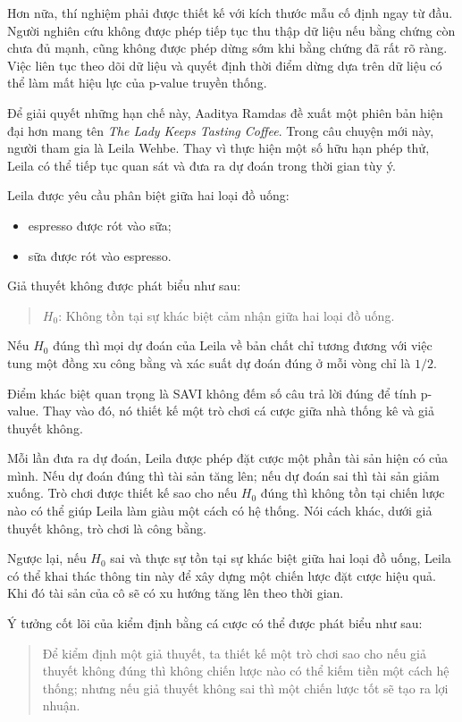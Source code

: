 Hơn nữa, thí nghiệm phải được thiết kế với kích thước mẫu cố định ngay từ đầu. Người nghiên cứu không được phép tiếp tục thu thập dữ liệu nếu bằng chứng còn chưa đủ mạnh, cũng không được phép dừng sớm khi bằng chứng đã rất rõ ràng. Việc liên tục theo dõi dữ liệu và quyết định thời điểm dừng dựa trên dữ liệu có thể làm mất hiệu lực của p-value truyền thống.

Để giải quyết những hạn chế này, Aaditya Ramdas đề xuất một phiên bản hiện đại hơn mang tên \textit{The Lady Keeps Tasting Coffee}. Trong câu chuyện mới này, người tham gia là Leila Wehbe. Thay vì thực hiện một số hữu hạn phép thử, Leila có thể tiếp tục quan sát và đưa ra dự đoán trong thời gian tùy ý.

Leila được yêu cầu phân biệt giữa hai loại đồ uống:
\begin{itemize}
    \item espresso được rót vào sữa;
    \item sữa được rót vào espresso.
\end{itemize}

Giả thuyết không được phát biểu như sau:
\begin{quote}
    $H_0$: Không tồn tại sự khác biệt cảm nhận giữa hai loại đồ uống.
\end{quote}

Nếu $H_0$ đúng thì mọi dự đoán của Leila về bản chất chỉ tương đương với việc tung một đồng xu công bằng và xác suất dự đoán đúng ở mỗi vòng chỉ là $1/2$.

Điểm khác biệt quan trọng là SAVI không đếm số câu trả lời đúng để tính p-value. Thay vào đó, nó thiết kế một trò chơi cá cược giữa nhà thống kê và giả thuyết không.

Mỗi lần đưa ra dự đoán, Leila được phép đặt cược một phần tài sản hiện có của mình. Nếu dự đoán đúng thì tài sản tăng lên; nếu dự đoán sai thì tài sản giảm xuống. Trò chơi được thiết kế sao cho nếu $H_0$ đúng thì không tồn tại chiến lược nào có thể giúp Leila làm giàu một cách có hệ thống. Nói cách khác, dưới giả thuyết không, trò chơi là công bằng.

Ngược lại, nếu $H_0$ sai và thực sự tồn tại sự khác biệt giữa hai loại đồ uống, Leila có thể khai thác thông tin này để xây dựng một chiến lược đặt cược hiệu quả. Khi đó tài sản của cô sẽ có xu hướng tăng lên theo thời gian.

Ý tưởng cốt lõi của kiểm định bằng cá cược có thể được phát biểu như sau:
\begin{quote}
    Để kiểm định một giả thuyết, ta thiết kế một trò chơi sao cho nếu giả thuyết không đúng thì không chiến lược nào có thể kiếm tiền một cách hệ thống; nhưng nếu giả thuyết không sai thì một chiến lược tốt sẽ tạo ra lợi nhuận.
\end{quote}

